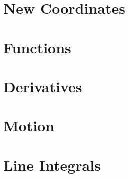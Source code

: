 \documentclass[letterpaper,oneside]{book}%
\newcommand{\wrapup}{
\bmw{\section{Wrap Up}
Once you have finished the problems in the section and feel comfortable with the ideas, create a short one page lesson plan that contains examples of the key ideas.  You will get a chance to teach from this lesson plan prior to taking the exam. Then log on to Brainhoney and download the quiz. Once you have taken the quiz, you can upload your work back to brainhoney and then download the key to see how you did. If you still need to work on mastering some of the ideas, please do so and then demonstrate your mastery though the quiz corrections.}
}
\newcommand{\bmw}[1]{}
\theoremstyle{plain}
\theoremstyle{box}
\theoremstyle{problem}
\begin{document}
\chapter{New Coordinates}

\wrapup

\chapter{Functions}

\wrapup

\chapter{Derivatives}

\wrapup

\chapter{Motion}

\wrapup


\chapter{Line Integrals}

\wrapup
\end{document}
